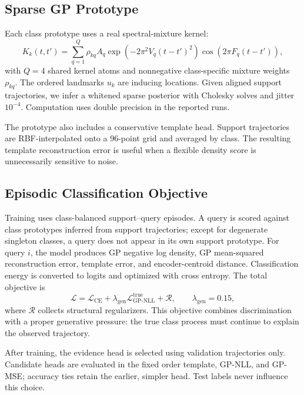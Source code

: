 \documentclass[11pt]{article}
\begin{document}
\subsection{Sparse GP Prototype}

Each class prototype uses a real spectral-mixture kernel:
\begin{equation}
  K_k(t,t') =
  \sum_{q=1}^{Q}
  \rho_{kq} A_q
  \exp\!\left(-2\pi^2 V_q(t-t')^2\right)
  \cos\!\left(2\pi F_q(t-t')\right),
  \label{eq:kernel}
\end{equation}
with $Q=4$ shared kernel atoms and nonnegative class-specific mixture weights $\rho_{kq}$. The ordered landmarks $u_k$ are inducing locations. Given aligned support trajectories, we infer a whitened sparse posterior with Cholesky solves and jitter $10^{-4}$. Computation uses double precision in the reported runs.

The prototype also includes a conservative template head. Support trajectories are RBF-interpolated onto a 96-point grid and averaged by class. The resulting template reconstruction error is useful when a flexible density score is unnecessarily sensitive to noise.

\subsection{Episodic Classification Objective}

Training uses class-balanced support--query episodes. A query is scored against class prototypes inferred from support trajectories; except for degenerate singleton classes, a query does not appear in its own support prototype. For query $i$, the model produces GP negative log density, GP mean-squared reconstruction error, template error, and encoder-centroid distance. Classification energy is converted to logits and optimized with cross entropy. The total objective is
\begin{equation}
  \mathcal{L} =
  \mathcal{L}_{\mathrm{CE}}
  + \lambda_{\mathrm{gen}}\mathcal{L}_{\mathrm{GP\text{-}NLL}}^{\mathrm{true}}
  + \mathcal{R},
 \qquad \lambda_{\mathrm{gen}}=0.15,
 \label{eq:objective}
\end{equation}
where $\mathcal{R}$ collects structural regularizers. This objective combines discrimination with a proper generative pressure: the true class process must continue to explain the observed trajectory.

After training, the evidence head is selected using validation trajectories only. Candidate heads are evaluated in the fixed order template, GP-NLL, and GP-MSE; accuracy ties retain the earlier, simpler head. Test labels never influence this choice.
\end{document}
